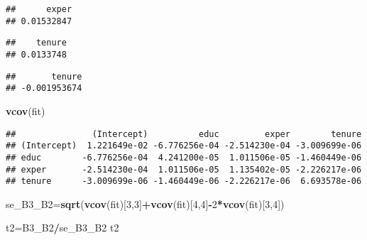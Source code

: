 \documentclass[
]{article}
\newenvironment{Shaded}{\begin{snugshade}}{\end{snugshade}}
\newcommand{\DecValTok}[1]{\textcolor[rgb]{0.00,0.00,0.81}{#1}}
\newcommand{\KeywordTok}[1]{\textcolor[rgb]{0.13,0.29,0.53}{\textbf{#1}}}
\newcommand{\NormalTok}[1]{#1}
\newcommand{\OperatorTok}[1]{\textcolor[rgb]{0.81,0.36,0.00}{\textbf{#1}}}
\newcommand{\StringTok}[1]{\textcolor[rgb]{0.31,0.60,0.02}{#1}}
\begin{document}
\begin{Shaded}
\end{Shaded}

\begin{verbatim}
##      exper 
## 0.01532847
\end{verbatim}

\begin{Shaded}
\end{Shaded}

\begin{verbatim}
##    tenure 
## 0.0133748
\end{verbatim}

\begin{Shaded}
\end{Shaded}

\begin{verbatim}
##       tenure 
## -0.001953674
\end{verbatim}

\begin{Shaded}
\begin{Highlighting}[]
\KeywordTok{vcov}\NormalTok{(fit)}
\end{Highlighting}
\end{Shaded}

\begin{verbatim}
##               (Intercept)          educ         exper        tenure
## (Intercept)  1.221649e-02 -6.776256e-04 -2.514230e-04 -3.009699e-06
## educ        -6.776256e-04  4.241200e-05  1.011506e-05 -1.460449e-06
## exper       -2.514230e-04  1.011506e-05  1.135402e-05 -2.226217e-06
## tenure      -3.009699e-06 -1.460449e-06 -2.226217e-06  6.693578e-06
\end{verbatim}

\begin{Shaded}
\begin{Highlighting}[]
\NormalTok{se_B3_B2=}\KeywordTok{sqrt}\NormalTok{(}\KeywordTok{vcov}\NormalTok{(fit)[}\DecValTok{3}\NormalTok{,}\DecValTok{3}\NormalTok{]}\OperatorTok{+}\KeywordTok{vcov}\NormalTok{(fit)[}\DecValTok{4}\NormalTok{,}\DecValTok{4}\NormalTok{]}\OperatorTok{-}\DecValTok{2}\OperatorTok{*}\KeywordTok{vcov}\NormalTok{(fit)[}\DecValTok{3}\NormalTok{,}\DecValTok{4}\NormalTok{]) }

\NormalTok{t2=B3_B2}\OperatorTok{/}\NormalTok{se_B3_B2}
\NormalTok{t2}
\end{Highlighting}
\end{Shaded}
\end{document}
